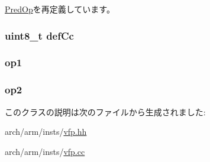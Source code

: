 \hyperlink{classArmISA_1_1PredOp_a273dc0fe84de8f4a9cf52aaf8dc27885}{PredOp}を再定義しています。\hypertarget{classArmISA_1_1FpCondCompRegOp_a67b4730d4f641c62c31e1b7724f93433}{
\subsubsection[{defCc}]{\setlength{\rightskip}{0pt plus 5cm}uint8\_\-t {\bf defCc}}}
\label{classArmISA_1_1FpCondCompRegOp_a67b4730d4f641c62c31e1b7724f93433}
\hypertarget{classArmISA_1_1FpCondCompRegOp_a4c465c43ad568f8bcf8ae71480e9cfea}{
\subsubsection[{op1}]{ {\bf op1}}}
\label{classArmISA_1_1FpCondCompRegOp_a4c465c43ad568f8bcf8ae71480e9cfea}
\hypertarget{classArmISA_1_1FpCondCompRegOp_a7799ff6cbe5a252199059eb8665820e7}{
\subsubsection[{op2}]{ {\bf op2}}}
\label{classArmISA_1_1FpCondCompRegOp_a7799ff6cbe5a252199059eb8665820e7}


このクラスの説明は次のファイルから生成されました:\begin{DoxyCompactItemize}
\item 
arch/arm/insts/\hyperlink{vfp_8hh}{vfp.hh}\item 
arch/arm/insts/\hyperlink{vfp_8cc}{vfp.cc}\end{DoxyCompactItemize}
